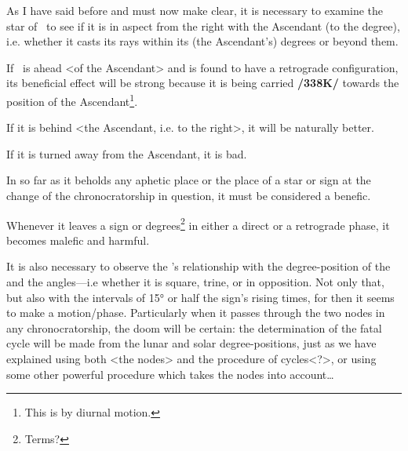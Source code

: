 As \mn{\Jupiter} I have said before and must now make clear, it is necessary to examine the star of \Jupiter\, to see if it is in aspect from the right with the Ascendant (to the degree), i.e. whether it casts its rays within its (the Ascendant’s) degrees or beyond them. 

If \Jupiter\, is ahead <of the Ascendant> and is found to have a retrograde configuration, its beneficial effect will be strong because it is being carried \textbf{/338K/} towards the position of the Ascendant\footnote{This is by diurnal motion.}. 

If it is behind <the Ascendant, i.e. to the right>, it will be naturally better. 

If it is turned away from the Ascendant, it is bad. 

In so far as it beholds any aphetic place or the place of a star or sign at the change of the chronocratorship in question, it must be considered a benefic. 

Whenever it leaves a sign or degrees\footnote{Terms?} in either a direct or a retrograde phase, it becomes malefic and harmful.

It \mn{\Moon} is also necessary to observe the \Moon’s relationship with the degree-position of the \Sun\, and the angles—i.e whether it is square, trine, or in opposition. Not only that, but also with the intervals of 15° or half the sign's rising times, for then it seems to make a motion/phase. Particularly when it passes through the two nodes in any chronocratorship, the doom will be certain: the determination of the fatal cycle will be made from the lunar and solar degree-positions, just as we have explained using both <the nodes> and the procedure of cycles<?>, or using some other powerful procedure which takes the nodes into account…


\newpage